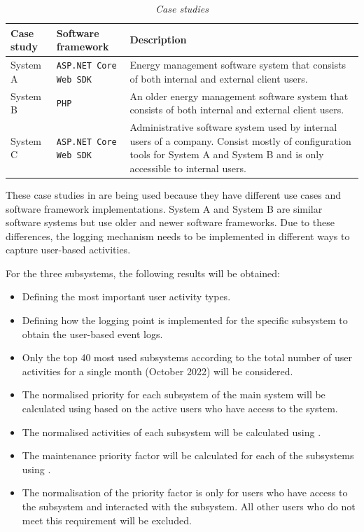 \begin{table}[!htb]
	\centering
	\caption[Case studies]
	{\textit{Case studies}}
	\label{tbl:ch3_caseStudies}
	\begin{tabularx}{\textwidth}{|X|X|X|}
		\hline \textbf{Case study} & \textbf{Software framework} & \textbf{Description} \\
		\hline System A & \texttt{ASP.NET Core Web SDK} & \RaggedRight Energy management software system that consists of both internal and external client users. \\
		\hline System B & \texttt{PHP} & \RaggedRight An older energy management software system that consists of both internal and external client users. \\
		\hline System C & \texttt{ASP.NET Core Web SDK} & \RaggedRight Administrative software system used by internal users of a company. Consist mostly of configuration tools for System A and System B and is only accessible to internal users. \\
		\hline
	\end{tabularx}
\end{table}

These case studies in  are being used because they have different use cases and software framework implementations. System A and System B are similar software systems but use older and newer software frameworks. Due to these differences, the logging mechanism needs to be implemented in different ways to capture user-based activities.\par For the three subsystems, the following results will be obtained:

\begin{itemize}
\item Defining the most important user activity types.
\item Defining how the logging point is implemented for the specific subsystem to obtain the user-based event logs.
\item Only the top 40 most used subsystems according to the total number of user activities for a single month (October 2022) will be considered.
\item The normalised priority for each subsystem of the main system will be calculated using  based on the active users who have access to the system.
\item The normalised activities of each subsystem will be calculated using .
\item The maintenance priority factor will be calculated for each of the subsystems using .
\item The normalisation of the priority factor is only for users who have access to the subsystem and interacted with the subsystem. All other users who do not meet this requirement will be excluded.
\end{itemize}

